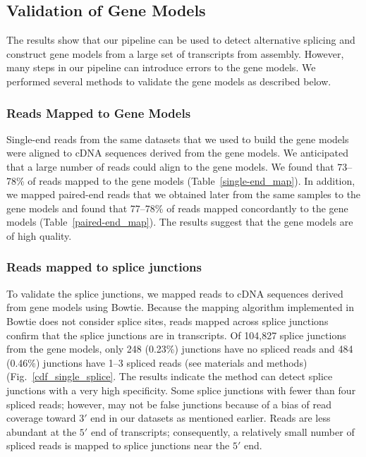 \documentclass[10pt]{article}
\begin{document}
\subsection*{Validation of Gene Models}

The results show that our pipeline can be used to detect alternative splicing and construct gene models from a large set of transcripts from assembly.
However, many steps in our pipeline can introduce errors to the gene models.
We performed several methods to validate the gene models as described below.

\subsubsection*{Reads Mapped to Gene Models}

Single-end reads from the same datasets that we used to build the gene models were aligned to cDNA sequences derived from the gene models.
We anticipated that a large number of reads could align to the gene models.
We found that 73--78\% of reads mapped to the gene models (Table~\ref{single-end_map}).
In addition, we mapped paired-end reads that we obtained later from the same samples to
the gene models and found that 77--78\% of reads mapped concordantly to the gene models (Table~\ref{paired-end_map}).
The results suggest that the gene models are of high quality.

\subsubsection*{Reads mapped to splice junctions}
To validate the splice junctions, we mapped reads to cDNA sequences derived from gene models using Bowtie\cite{Langmead:2009fv}.
Because the mapping algorithm implemented in Bowtie does not consider splice sites, reads mapped across splice junctions
confirm that the splice junctions are in transcripts.
Of 104,827 splice junctions from the gene models, only 248 (0.23\%) junctions have no spliced reads and 484 (0.46\%)
junctions have 1--3 spliced reads (see materials and methods) (Fig.~\ref{cdf_single_splice}.
The results indicate the method can detect splice junctions with a very high specificity.
Some splice junctions with fewer than four spliced reads; however, may not be false junctions because of a bias of
read coverage toward $3'$ end in our datasets as mentioned earlier.
Reads are less abundant at the $5'$ end of transcripts; consequently, a relatively small number of spliced reads is mapped
to splice junctions near the $5'$ end.
\end{document}
